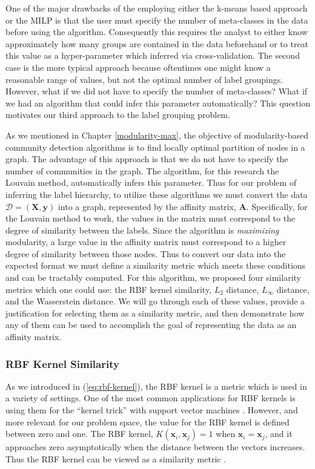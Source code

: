 \documentclass[../thesis.tex]{subfiles}
\begin{document}
One of the major drawbacks of the employing either the k-means based approach or
the MILP is that the user must specify the number of meta-classes in the data
before using the algorithm. Consequently this requires the analyst to either
know approximately how many groups are contained in the data beforehand or to
treat this value as a hyper-parameter which inferred via cross-validation. The
second case is the more typical approach because oftentimes one might know a
reasonable range of values, but not the optimal number of label groupings.
However, what if we did not have to specify the number of meta-classes? What if
we had an algorithm that could infer this parameter automatically? This question
motivates our third approach to the label grouping problem.

As we mentioned in Chapter \ref{modularity-max}, the objective of
modularity-based community detection algorithms is to find locally optimal
partition of nodes in a graph. The advantage of this approach is that we do not
have to specify the number of communities in the graph. The algorithm, for this
research the Louvain method, automatically infers this parameter. Thus for our
problem of inferring the label hierarchy, to utilize these algorithms we must
convert the data $\mathcal{D} = (\mathbf{X}, \mathbf{y})$ into a graph,
represented by the affinity matrix, $\mathbf{A}$. Specifically, for the Louvain
method to work, the values in the matrix must correspond to the degree of
similarity between the labels. Since the algorithm is \textit{maximizing}
modularity, a large value in the affinity matrix must correspond to a higher
degree of similarity between those nodes. Thus to convert our data into the
expected format we must define a similarity metric which meets these conditions
and can be tractably computed. For this algorithm, we proposed four similarity
metrics which one could use: the RBF kernel similarity, $L_2$ distance,
$L_\infty$ distance, and the Wasserstein distance. We will go through each of
these values, provide a justification for selecting them as a similarity metric,
and then demonstrate how any of them can be used to accomplish the goal of
representing the data as an affinity matrix.

\subsubsection{RBF Kernel Similarity}
As we introduced in (\ref{eq:rbf-kernel}), the RBF kernel is a metric which is
used in a variety of settings. One of the most common applications for RBF
kernels is using them for the ``kernel trick'' with support vector machines
\cite{rahimi2008random}. However, and more relevant for our problem space, the
value for the RBF kernel is defined between zero and one. The RBF kernel,
$K(\mathbf{x}_i, \mathbf{x}_j) = 1$ when $\mathbf{x}_i = \mathbf{x}_j$, and it
approaches zero asymptotically when the distance between the vectors increases.
Thus the RBF kernel can be viewed as a similarity metric \cite{vert2004primer}.
\end{document}
